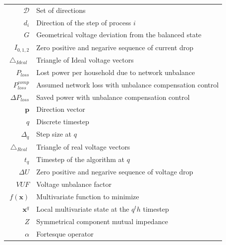   \begin{scriptsize}
\begin{tabularx}{\textwidth}{r|X}
$\mathcal{D}$											& Set of directions\\
$d_i$                             & Direction of the step of process $i$\\
$G$                               & Geometrical voltage deviation from the balanced state\\
$I_{0,1,2}$												& Zero positive and negarive sequence of current drop\\	
$\bigtriangleup_{Ideal}$          & Triangle of Ideal voltage vectors\\ 
$P_{loss}$                        & Lost power per household due to network unbalance\\
  $P^{comp}_{loss}$                 & Assumed network loss with unbalance compensation control\\
  $\Delta P_{loss}$                 & Saved power with unbalance compensation control\\
  $\textbf{p}$                      & Direction vector\\
  $q$                               & Discrete timestep\\
  $\Delta_q$                        & Step size at $q$\\
  $\bigtriangleup_{Real}$           & Triangle of real voltage vectors\\
  $t_q$                             & Timestep of the algorithm at $q$\\
  $\Delta U$													& Zero positive and negarive sequence of voltage drop\\
  $VUF$                             & Voltage unbalance factor\\
  $f(\textbf{x})$										& Multivariate function to minimize\\
  $\textbf{x}^{q}$                           & Local multivariate state at the $q^th$ timestep\\
  $Z$																& Symmetrical component mutual impedance\\
  $\alpha$													& Fortesque operator\\
\end{tabularx}
\end{scriptsize} 